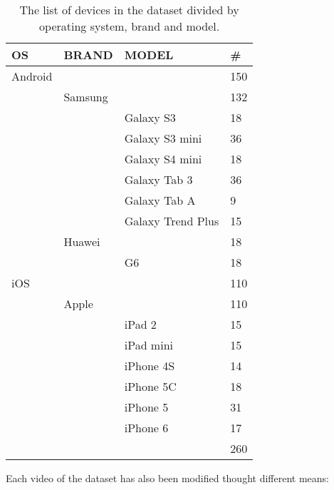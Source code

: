 \begin{table}[]
\centering
\begin{tabular}{|l|l|l|l|}
\hline
\textbf{OS}       & \textbf{BRAND}    & \textbf{MODEL}             & \textbf{\#}			 \\ \hline
Android &         &                   & 150         \\ \hline
        & Samsung &                   & 132         \\ \hline
        &         & Galaxy S3         & 18          \\ \hline
        &         & Galaxy S3 mini    & 36          \\ \hline
        &         & Galaxy S4 mini    & 18          \\ \hline
        &         & Galaxy Tab 3      & 36          \\ \hline
        &         & Galaxy Tab A      & 9           \\ \hline
        &         & Galaxy Trend Plus & 15          \\ \hline
        & Huawei  &                   & 18          \\ \hline
        &         & G6                & 18          \\ \hline
iOS     &         &                   & 110         \\ \hline
        & Apple   &                   & 110         \\ \hline
        &         & iPad 2            & 15          \\ \hline
        &         & iPad mini         & 15          \\ \hline
        &         & iPhone 4S         & 14          \\ \hline
        &         & iPhone 5C         & 18          \\ \hline
        &         & iPhone 5          & 31          \\ \hline
        &         & iPhone 6          & 17          \\ \hline
        &         &                   & 260         \\ \hline

\end{tabular}
\caption{The list of devices in the dataset divided by operating system, brand and model.}
\label{devices}
\end{table}

Each video of the dataset has also been modified thought different means:

